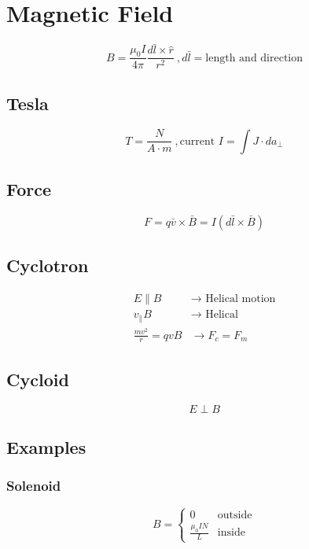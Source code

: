 \documentclass[10pt,letter]{article}
\begin{document}
\section{Magnetic Field} %
\label{sec:magnetic_field}
\begin{equation}
    B = \frac{\mu_0 I }{4\pi} \frac{d\bar{l} \times \hat{r}}{r^2}~, d\bar{l}=\textrm{length and direction}
\end{equation}
\subsection{Tesla} %
\label{sub:tesla}
\begin{equation}
    T = \frac{N}{A\cdot m}~, \textrm{current } I = \int J \cdot da_\perp
\end{equation}
\subsection{Force} %
\label{sub:force}
\begin{equation}
    F = q\bar{v} \times \bar{B} = I (d\bar{l} \times \bar{B})
\end{equation}
\subsection{Cyclotron} %
\label{sub:cyclotron}
\begin{align}
    E \parallel B &\rightarrow \textrm{ Helical motion}\\
    v_\parallel B &\rightarrow \textrm{ Helical}\\
    \frac{mv^2}{r} = qvB &\rightarrow F_c = F_m
\end{align}
\subsection{Cycloid} %
\label{sub:cycloid}
\begin{equation}
    E \perp B
\end{equation}
\subsection{Examples} %
\label{sub:examples}
\subsubsection{Solenoid} %
\label{ssub:solenoid}
\[
 B =
  \begin{cases}
   0 & \textrm{outside}  \\
   \frac{\mu_0 IN}{L}& \textrm{inside}
  \end{cases}
\]
\end{document}
